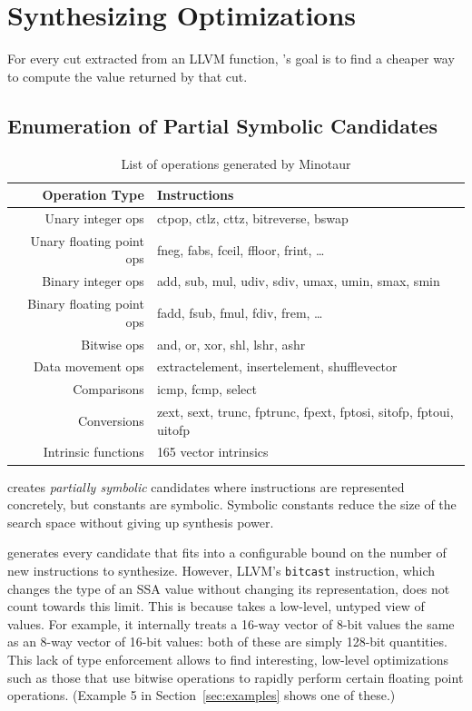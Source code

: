 
\section{Synthesizing Optimizations}

For every cut extracted from an LLVM function, \minotaur{}'s goal is to
find a cheaper way to compute the value returned by that cut.


\subsection{Enumeration of Partial Symbolic Candidates}

\begin{table}[t]
  \centering
  \begin{tabular}{ r | l }
    \hline
    \textbf{Operation Type} & \textbf{Instructions} \\
    \hline \hline
    Unary integer ops & ctpop, ctlz, cttz, bitreverse, bswap \\
    Unary floating point ops & fneg, fabs, fceil, ffloor, frint, \dots \\
    Binary integer ops & add, sub, mul, udiv, sdiv, umax, umin, smax, smin\\
    Binary floating point ops & fadd, fsub, fmul, fdiv, frem, \dots \\
    Bitwise ops & and, or, xor, shl, lshr, ashr \\
    Data movement ops & extractelement, insertelement, shufflevector \\
    Comparisons & icmp, fcmp, select \\
    Conversions & zext, sext, trunc, fptrunc, fpext, fptosi, sitofp, fptoui, uitofp \\
    Intrinsic functions & 165 vector intrinsics \\
    \hline
  \end{tabular}
  \caption{List of operations generated by Minotaur}
  \label{tab:operations}
\end{table}


\minotaur{} creates \emph{partially symbolic} candidates where
instructions are represented concretely, but constants are symbolic.
%
Symbolic constants reduce the size of the search space without giving
up synthesis power.


\minotaur{} generates every candidate that fits into a configurable bound
on the number of new instructions to synthesize.
%
However, LLVM's \texttt{bitcast} instruction, which changes the type
of an SSA value without changing its representation, does not count
towards this limit.
%
This is because \minotaur{} takes a low-level, untyped view of values.
%
For example, it internally treats a 16-way vector of 8-bit values the
same as an 8-way vector of 16-bit values: both of these are simply
128-bit quantities.
%
This lack of type enforcement allows \minotaur{} to find interesting,
low-level optimizations such as those that use bitwise operations to
rapidly perform certain floating point operations.
%
(Example 5 in Section~\ref{sec:examples} shows one of these.)


